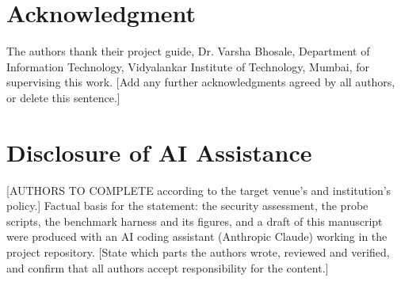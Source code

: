 \documentclass[conference]{IEEEtran}
\begin{document}
\section*{Acknowledgment}
The authors thank their project guide, Dr. Varsha Bhosale, Department of Information Technology, Vidyalankar Institute of Technology, Mumbai, for supervising this work. [Add any further acknowledgments agreed by all authors, or delete this sentence.]

\section*{Disclosure of AI Assistance}
[AUTHORS TO COMPLETE according to the target venue's and institution's policy.] Factual basis for the statement: the security assessment, the probe scripts, the benchmark harness and its figures, and a draft of this manuscript were produced with an AI coding assistant (Anthropic Claude) working in the project repository. [State which parts the authors wrote, reviewed and verified, and confirm that all authors accept responsibility for the content.]



\end{document}
